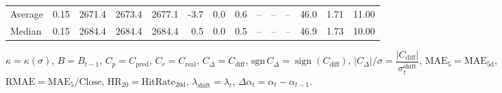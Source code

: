 \begin{threeparttable}
{\begin{tabular}{lrrrrrrrrrrrrr}
Average &     0.15 & 2671.4 & 2673.4 & 2677.1 &       -3.7 &                      0.0 &                 0.6 &         -- &        -- &             -- &             46.0 &            1.71 &                  11.00 \\
 Median &     0.15 & 2684.4 & 2684.4 & 2684.4 &        0.5 &                      0.0 &                 0.5 &         -- &        -- &             -- &             46.9 &            1.73 &                  10.00 \\
\bottomrule
\end{tabular}
}
\begin{tablenotes}\footnotesize
\item $\kappa=\kappa(\sigma)$, $B=B_{t-1}$, $C_p=C_{\text{pred}}$, $C_r=C_{\text{real}}$, $C_\Delta=C_{\text{diff}}$, $\mathrm{sgn}\,C_\Delta=\operatorname{sign}(C_{\text{diff}})$, $|C_\Delta|/\sigma=\dfrac{|C_{\text{diff}}|}{\sigma_t^{\text{shift}}}$, $\mathrm{MAE}_5=\mathrm{MAE}_{5\text{d}}$, $\mathrm{RMAE}= \mathrm{MAE}_5 / \text{Close}$, $\mathrm{HR}_{20}=\mathrm{HitRate}_{20\text{d}}$, 
$\lambda_{\text{shift}}=\lambda_t$, 
$\Delta\alpha_t=\alpha_t-\alpha_{t-1}$.
\end{tablenotes}
\end{threeparttable}
\endgroup

